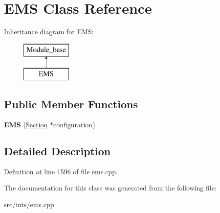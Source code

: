\hypertarget{classEMS}{\section{E\-M\-S Class Reference}
\label{classEMS}
}
Inheritance diagram for E\-M\-S\-:\begin{figure}[H]
\begin{center}
\leavevmode
\includegraphics[height=2.000000cm]{classEMS}
\end{center}
\end{figure}
\subsection*{Public Member Functions}
\begin{DoxyCompactItemize}
\item 
\hypertarget{classEMS_a580595567b3555bb47ee6d0eb1187815}{{\bfseries E\-M\-S} (\hyperlink{classSection}{Section} $\ast$configuration)}\label{classEMS_a580595567b3555bb47ee6d0eb1187815}

\end{DoxyCompactItemize}


\subsection{Detailed Description}


Definition at line 1596 of file ems.\-cpp.



The documentation for this class was generated from the following file\-:\begin{DoxyCompactItemize}
\item 
src/ints/ems.\-cpp\end{DoxyCompactItemize}
